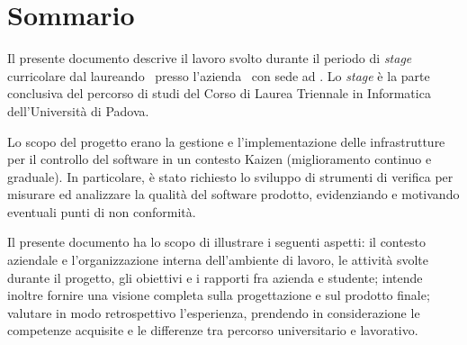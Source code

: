 \cleardoublepage
{}
\section*{Sommario}
\thispagestyle{empty}

Il presente documento descrive il lavoro svolto durante il periodo di \textit{stage} curricolare dal laureando \myName\ presso l'azienda \companyName\ con sede ad \companyPlace.
Lo \textit{stage} è la parte conclusiva del percorso di studi del Corso di Laurea Triennale in Informatica dell'Università di Padova.

Lo scopo del progetto erano la gestione e l'implementazione delle infrastrutture per il controllo del software in un contesto Kaizen (miglioramento continuo e graduale). In particolare, è stato richiesto lo sviluppo di strumenti di verifica per misurare ed analizzare la qualità del software prodotto, evidenziando e motivando eventuali punti di non conformità.

Il presente documento ha lo scopo di illustrare i seguenti aspetti: il contesto aziendale e l'organizzazione interna dell'ambiente di lavoro, le attività svolte durante il progetto, gli obiettivi e i rapporti fra azienda e studente; intende inoltre fornire una visione completa sulla progettazione e sul prodotto finale; valutare in modo retrospettivo l'esperienza, prendendo in considerazione le competenze acquisite e le differenze tra percorso universitario e lavorativo.

\bigskip